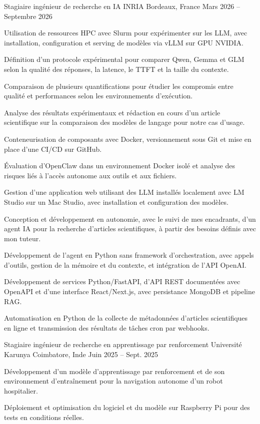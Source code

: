 
\begin{cventries}
  \cventry
    {Stagiaire ingénieur de recherche en IA}
    {INRIA}
    {Bordeaux, France}
    {Mars 2026 -- Septembre 2026}
    {
      \begin{cvitems}
        \item {Utilisation de ressources HPC avec Slurm pour expérimenter sur les LLM, avec installation, configuration et serving de modèles via vLLM sur GPU NVIDIA.}
        \item {Définition d’un protocole expérimental pour comparer Qwen, Gemma et GLM selon la qualité des réponses, la latence, le TTFT et la taille du contexte.}
        \item {Comparaison de plusieurs quantifications pour étudier les compromis entre qualité et performances selon les environnements d’exécution.}
        \item {Analyse des résultats expérimentaux et rédaction en cours d’un article scientifique sur la comparaison des modèles de langage pour notre cas d’usage.}
        \item {Conteneurisation de composants avec Docker, versionnement sous Git et mise en place d’une CI/CD sur GitHub.}
        \item {Évaluation d’OpenClaw dans un environnement Docker isolé et analyse des risques liés à l’accès autonome aux outils et aux fichiers.}
        \item {Gestion d’une application web utilisant des LLM installés localement avec LM Studio sur un Mac Studio, avec installation et configuration des modèles.}
        \item {Conception et développement en autonomie, avec le suivi de mes encadrants, d’un agent IA pour la recherche d’articles scientifiques, à partir des besoins définis avec mon tuteur.}
        \item {Développement de l’agent en Python sans framework d’orchestration, avec appels d’outils, gestion de la mémoire et du contexte, et intégration de l’API OpenAI.}
        \item {Développement de services Python/FastAPI, d’API REST documentées avec OpenAPI et d’une interface React/Next.js, avec persistance MongoDB et pipeline RAG.}
        \item {Automatisation en Python de la collecte de métadonnées d’articles scientifiques en ligne et transmission des résultats de tâches cron par webhooks.}
      \end{cvitems}
    }

  \cventry
    {Stagiaire ingénieur de recherche en apprentissage par renforcement}
    {Université Karunya}
    {Coimbatore, Inde}
    {Juin 2025 -- Sept. 2025}
    {
      \begin{cvitems}
        \item {Développement d’un modèle d’apprentissage par renforcement et de son environnement d’entraînement pour la navigation autonome d’un robot hospitalier.}
        \item {Déploiement et optimisation du logiciel et du modèle sur Raspberry Pi pour des tests en conditions réelles.}
      \end{cvitems}
    }
\end{cventries}
